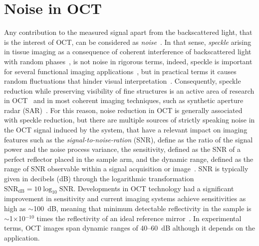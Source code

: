 \section{Noise in OCT}

Any contribution to the measured signal apart from the backscattered light, that is the interest of OCT, can be considered as \textit{noise}~\cite{Izatt2015_Theory}. In that sense, \textit{speckle} arising in tissue imaging as a consequence of coherent interference of backscattered light with random phases~\cite{Goodman2007_Speckle}, is not noise in rigorous terms, indeed, speckle is important for several functional imaging applications~\cite{Wang2007_Three, Lee2012_Dynamic, Liu2013_Quantitative}, but in practical terms it causes random fluctuations that hinder visual interpretation~\cite{Schmitt1999_Speckle}. Consequently, speckle reduction while preserving visibility of fine structures is an active area of research in OCT~\cite{Cuartas-Velez2018_Volumetric} and in most coherent imaging techniques, such as synthetic aperture radar (SAR)~\cite{Argenti2013_Tutorial}. For this reason, noise reduction in OCT is generally associated with speckle reduction, but there are multiple sources of strictly speaking noise in the OCT signal induced by the system, that have a relevant impact on imaging features such as the \textit{signal-to-noise-ration} (SNR), define as the ratio of the signal power and the noise process variance, the sensitivity, defined as the SNR of a perfect reflector placed in the sample arm, and the dynamic range, defined as the range of SNR observable within a signal acquisition or image~\cite{Izatt2015_Theory, deBoer2003_Improved}. SNR is typically given in decibels (dB) through the logarithmic transformation $\text{SNR}_{\text{dB}} = 10\log_{10}\text{SNR}$. Developments in OCT technology had a significant improvement in sensitivity and current imaging systems achieve sensitivities as high as $\sim$100~dB, meaning that minimum detectable reflectivity in the sample is $\sim$1$\times$10$^{-10}$ times the reflectivity of an ideal reference mirror~\cite{Izatt2015_Theory}. In experimental terms, OCT images span dynamic ranges of 40--60~dB although it depends on the application.

